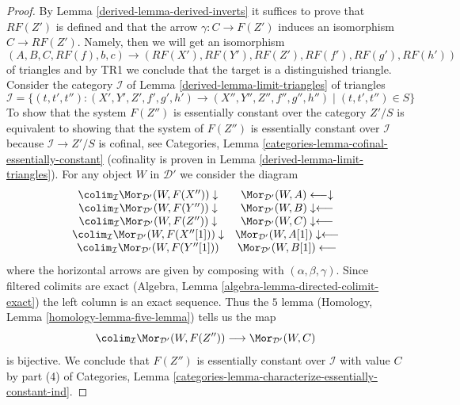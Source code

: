 \begin{proof}
\medskip\noindent
By Lemma \ref{derived-lemma-derived-inverts} it suffices to prove that $RF(Z')$
is defined and that the arrow $\gamma : C \to F(Z')$ induces an isomorphism
$C \to RF(Z')$. Namely, then we will get an isomorphism
$$
(A, B, C, RF(f), b, c)
\longrightarrow
(RF(X'), RF(Y'), RF(Z'), RF(f'), RF(g'), RF(h'))
$$
of triangles and by TR1 we conclude that the target is a
distinguished triangle. Consider the category $\mathcal{I}$ of
Lemma \ref{derived-lemma-limit-triangles}
of triangles
$$
\mathcal{I} =
\{(t, t', t'') : (X', Y', Z', f', g', h') \to (X'', Y'', Z'', f'', g'', h'')
\mid (t, t', t'') \in S\}
$$
To show that the system $F(Z'')$ is essentially constant over the category
$Z'/S$ is equivalent to showing that the system of $F(Z'')$ is essentially
constant over $\mathcal{I}$ because $\mathcal{I} \to Z'/S$ is cofinal, see
Categories, Lemma \ref{categories-lemma-cofinal-essentially-constant}
(cofinality is proven in Lemma \ref{derived-lemma-limit-triangles}).
For any object $W$ in $\mathcal{D}'$ we
consider the diagram
$$
\begin{array}{cc}\colim_\mathcal{I} \Mor_{\mathcal{D}'}(W, F(X'')) \downarrow & \Mor_{\mathcal{D}'}(W, A) \longleftarrow\downarrow \\ \colim_\mathcal{I} \Mor_{\mathcal{D}'}(W, F(Y'')) \downarrow & \Mor_{\mathcal{D}'}(W, B) \downarrow\longleftarrow \\ \colim_\mathcal{I} \Mor_{\mathcal{D}'}(W, F(Z'')) \downarrow & \Mor_{\mathcal{D}'}(W, C) \downarrow\longleftarrow \\ \colim_\mathcal{I} \Mor_{\mathcal{D}'}(W, F(X''[1])) \downarrow & \Mor_{\mathcal{D}'}(W, A[1]) \downarrow\longleftarrow \\ \colim_\mathcal{I} \Mor_{\mathcal{D}'}(W, F(Y''[1])) & \Mor_{\mathcal{D}'}(W, B[1]) \longleftarrow\end{array}
$$
where the horizontal arrows are given by composing with
$(\alpha, \beta, \gamma)$. Since filtered colimits are exact
(Algebra, Lemma \ref{algebra-lemma-directed-colimit-exact}) the left column
is an exact sequence. Thus the $5$ lemma
(Homology, Lemma \ref{homology-lemma-five-lemma}) tells us the map
$$
\colim_\mathcal{I} \Mor_{\mathcal{D}'}(W, F(Z''))
\longrightarrow
\Mor_{\mathcal{D}'}(W, C)
$$
is bijective. We conclude that $F(Z'')$ is essentially constant
over $\mathcal{I}$ with value $C$ by part (4) of
Categories, Lemma \ref{categories-lemma-characterize-essentially-constant-ind}.
\end{proof}

